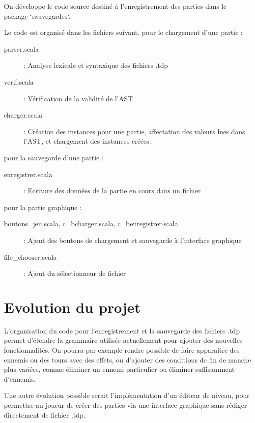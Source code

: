 \documentclass{article}
\begin{document}
On développe le code source destiné à l'enregistrement des parties dans le package `sauvegardes`.

Le code est organisé dans les fichiers suivant, pour le chargement d'une partie :
\begin{description}
\item[parser.scala] : Analyse lexicale et syntaxique des fichiers .tdp
\item[verif.scala] : Vérification de la validité de l'AST
\item[charger.scala] : Création des instances pour une partie, affectation des valeurs lues dans l'AST, et chargement des instances créées.
\end{description}
pour la sauvegarde d'une partie :
\begin{description}
\item[enregistrer.scala] : Ecriture des données de la partie en cours dans un fichier
\end{description}
pour la partie graphique :
\begin{description}
\item[boutons\_jeu.scala, c\_bcharger.scala, c\_benregistrer.scala] : Ajout des boutons de chargement et sauvegarde à l'interface graphique
\item[file\_chooser.scala] : Ajout du sélectionneur de fichier
\end{description}

\section{Evolution du projet}

L'organisation du code pour l'enregistrement et la sauvegarde des fichiers .tdp permet d'étendre la grammaire utilisée actuellement pour ajouter des nouvelles fonctionnalités.
On pourra par exemple rendre possible de faire apparaitre des ennemis ou des tours avec des effets, ou d'ajouter des conditions de fin de manche plus variées, comme éliminer un ennemi particulier ou éliminer suffisamment d'ennemis.

Une autre évolution possible serait l'implémentation d'un éditeur de niveau, pour permettre au joueur de créer des parties via une interface graphique sans rédiger directement de fichier .tdp.
\end{document}

